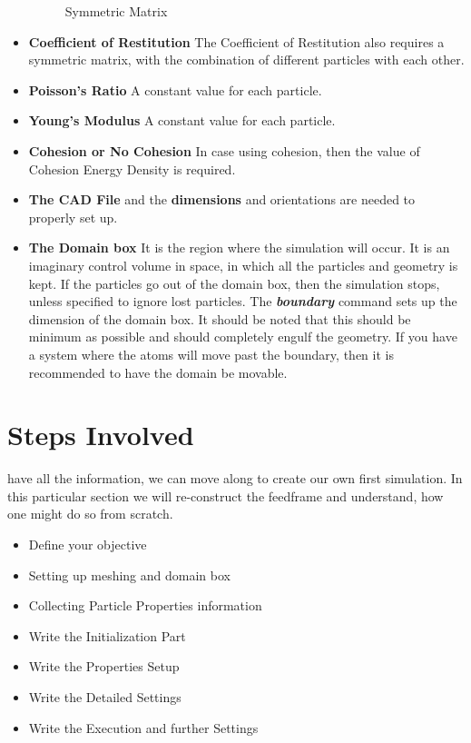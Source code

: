 \documentclass{tufte-book} %
\begin{document}
\begin{itemize}
\begin{figure}
    
    \caption{Symmetric Matrix}
    \label{fig:matrix}
  \end{figure}
\item \textbf{Coefficient of Restitution} The Coefficient of Restitution also requires a symmetric matrix, with the combination of different particles with each other.
\item \textbf{Poisson's Ratio} A constant value for each particle.
\item \textbf{Young's Modulus} A constant value for each particle.
\item \textbf{Cohesion or No Cohesion} In case using cohesion, then the value of Cohesion Energy Density is required.
\item\textbf{ The CAD File} and the\textbf{ dimensions} and orientations are needed to properly set up.
\item \textbf{The Domain box} It is the region where the simulation will occur. It is an imaginary control volume in space, in which all the particles and geometry is kept. If the particles go out of the domain box, then the simulation stops, unless specified to ignore lost particles. The \textbf{\emph{boundary}} command sets up the dimension of the domain box. It should be noted that this should be minimum as possible and should completely engulf the geometry. If you have a system where the atoms will move past the boundary, then it is recommended to have the domain be movable. 
\end{itemize}

\section{Steps Involved}
\begin{fullwidth}
   have all the information, we can move along to create our own first simulation. In this particular section we will re-construct the feedframe and understand, how one might do so from scratch. 
\end{fullwidth}

\begin{itemize}
\item Define your objective
\item Setting up meshing and domain box
\item Collecting Particle Properties information
\item Write the Initialization Part
\item Write the Properties Setup
\item Write the Detailed Settings
\item Write the Execution and further Settings
\end{itemize}
\end{document}
